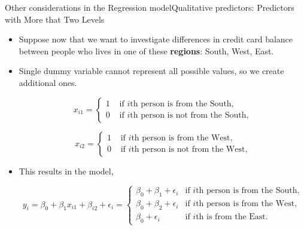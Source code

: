 \begin{frame}{Other considerations in the Regression model}{Qualitative predictors: Predictors with More that Two Levels}

\begin{itemize}
    \item Suppose now that we want to investigate differences in credit card balance between people who lives in one of these \textbf{regions}: South, West, East. \pause
    \item Single dummy variable cannot represent all possible values, so we create additional ones. \pause

\begin{equation*}
        x_{i1} = 
        \begin{cases} 
            1 & \text{ if $i$th person is from the South,}\\
            0 & \text{ if $i$th person is not from the South,}
        \end{cases}
    \end{equation*}

\begin{equation*}
        x_{i2} = 
        \begin{cases} 
            1 & \text{ if $i$th person is from the West,}\\
            0 & \text{ if $i$th person is not from the West,}
        \end{cases}
    \end{equation*}
    \item This results in the model, \pause

\begin{equation*}
        y_i = \beta_0 + \beta_1 x_{i1} + \beta_{i2} + \epsilon_i = 
        \begin{cases}
        \beta_0 + \beta_1 + \epsilon_i & \text{if $i$th person is from the South,} \\
        \beta_0 + \beta_2 + \epsilon_i & \text{if $i$th person is from the West,} \\
        \beta_0 + \epsilon_i & \text{if $i$th is from the East.}
        \end{cases}
\end{equation*}
    
\end{itemize}

\end{frame}


